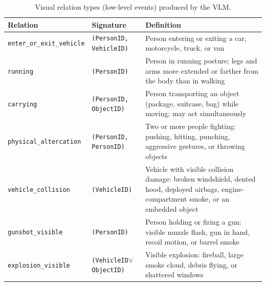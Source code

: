\begin{table}[h]
  \centering\small
  \caption{Visual relation types (low-level events) produced by the VLM.}
  \label{tab:visual_relations}
  \begin{tabular}{@{}>{\raggedright}p{126pt}>{\raggedright}p{126pt}>{\raggedright\arraybackslash}p{126pt}@{}}
    \toprule
    Relation & Signature & Definition \\
    \midrule
    \texttt{enter\_or\_exit\_vehicle} & \texttt{(PersonID, VehicleID)} & Person entering or exiting a car, motorcycle, truck, or van \\
    \addlinespace
    \texttt{running} & \texttt{(PersonID)} & Person in running posture; legs and arms more extended or farther from the body than in walking \\
    \addlinespace
    \texttt{carrying} & \texttt{(PersonID, ObjectID)} & Person transporting an object (package, suitcase, bag) while moving; may act simultaneously \\
    \addlinespace
    \texttt{physical\_altercation} & \texttt{(PersonID, PersonID)} & Two or more people fighting: pushing, hitting, punching, aggressive gestures, or throwing objects \\
    \addlinespace
    \texttt{vehicle\_collision} & \texttt{(VehicleID)} & Vehicle with visible collision damage: broken windshield, dented hood, deployed airbags, engine-compartment smoke, or an embedded object \\
    \addlinespace
    \texttt{gunshot\_visible} & \texttt{(PersonID)} & Person holding or firing a gun: visible muzzle flash, gun in hand, recoil motion, or barrel smoke \\
    \addlinespace
    \texttt{explosion\_visible} & \texttt{(VehicleID$\vee$ObjectID)} & Visible explosion: fireball, large smoke cloud, debris flying, or shattered windows \\
    \bottomrule
  \end{tabular}
\end{table}

